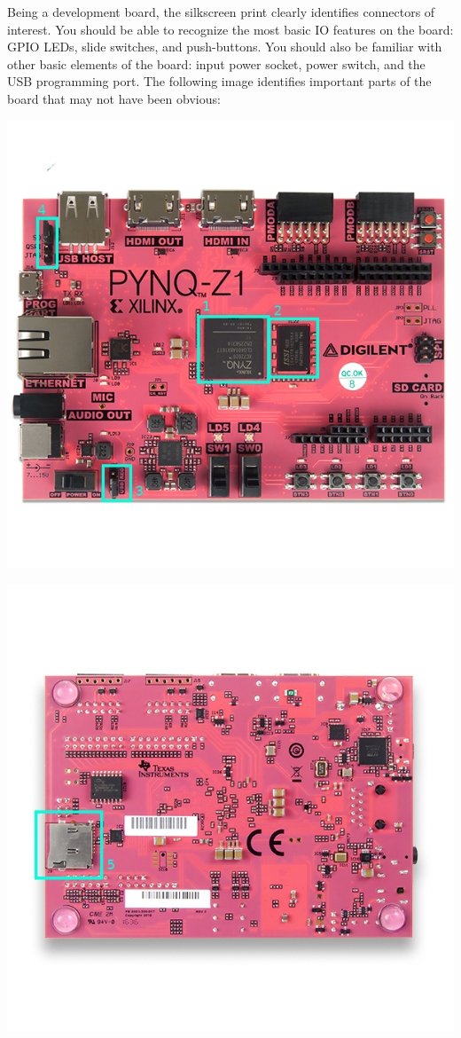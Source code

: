 \documentclass[11pt]{article}
\begin{document}
Being a development board, the silkscreen print clearly identifies connectors of interest. You should be able to recognize the most basic IO features on the board: GPIO LEDs, slide switches, and push-buttons. You should also be familiar with other basic elements of the board: input power socket, power switch, and the USB programming port. The following image identifies important parts of the board that may not have been obvious:

\begin{minipage}[h]{0.5\textwidth}
    \includegraphics[width=\textwidth]{figs/z1_top_annotated.png}
\end{minipage}
\begin{minipage}[h]{0.5\textwidth}
    \includegraphics[width=\textwidth]{figs/z1_bottom_annotated.png}
\end{minipage}
\end{document}
